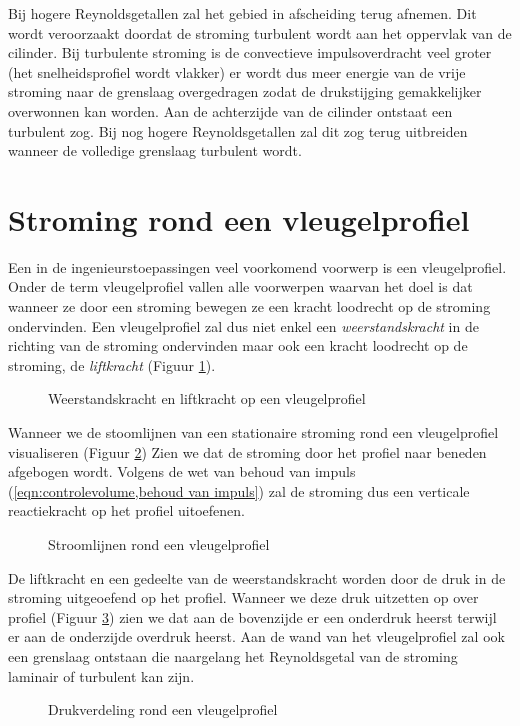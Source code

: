 Bij hogere Reynoldsgetallen zal het gebied in afscheiding terug afnemen. Dit wordt veroorzaakt doordat de stroming turbulent wordt aan het oppervlak van de cilinder. Bij turbulente stroming is de convectieve impulsoverdracht veel groter (het snelheidsprofiel wordt vlakker) er wordt dus meer energie van de vrije stroming naar de grenslaag overgedragen zodat de drukstijging gemakkelijker overwonnen kan worden. Aan de achterzijde van de cilinder ontstaat een turbulent zog. Bij nog hogere Reynoldsgetallen zal dit zog terug uitbreiden wanneer de volledige grenslaag turbulent wordt.

	\section{Stroming rond een vleugelprofiel}
	\label{sec:Stroming rond een vleugelprofiel}

Een in de ingenieurstoepassingen veel voorkomend voorwerp is een vleugelprofiel. Onder de term vleugelprofiel vallen alle voorwerpen waarvan het doel is dat wanneer ze door een stroming bewegen ze een kracht loodrecht op de stroming ondervinden. Een vleugelprofiel zal dus niet enkel een \emph{weerstandskracht} in de richting van de stroming ondervinden maar ook een kracht loodrecht op de stroming, de \emph{liftkracht} (Figuur \ref{fig:vleugelprofiel krachten}).
\begin{figure}[htb]
	\centering
	
	\caption{Weerstandskracht en liftkracht op een vleugelprofiel}
	\label{fig:vleugelprofiel krachten}
\end{figure}

Wanneer we de stoomlijnen van een stationaire stroming rond een vleugelprofiel visualiseren (Figuur \ref{fig:vleugelprofiel stroomlijnen}) Zien we dat de stroming door het profiel naar beneden afgebogen wordt. Volgens de wet van behoud van impuls (\ref{eqn:controlevolume,behoud van impuls}) zal de stroming dus een verticale reactiekracht op het profiel uitoefenen.
\begin{figure}[htb]
	\centering
	
	\caption{Stroomlijnen rond een vleugelprofiel}
	\label{fig:vleugelprofiel stroomlijnen}
\end{figure}
De liftkracht en een gedeelte van de weerstandskracht worden door de druk in de stroming uitgeoefend op het profiel. Wanneer we deze druk uitzetten op over profiel (Figuur \ref{fig:vleugelprofiel drukverdeling}) zien we dat aan de bovenzijde er een onderdruk heerst terwijl er aan de onderzijde overdruk heerst. Aan de wand van het vleugelprofiel zal ook een grenslaag ontstaan die naargelang het Reynoldsgetal van de stroming laminair of turbulent kan zijn.
\begin{figure}[htb]
	\centering
	
	\caption{Drukverdeling rond een vleugelprofiel}
	\label{fig:vleugelprofiel drukverdeling}
\end{figure}

